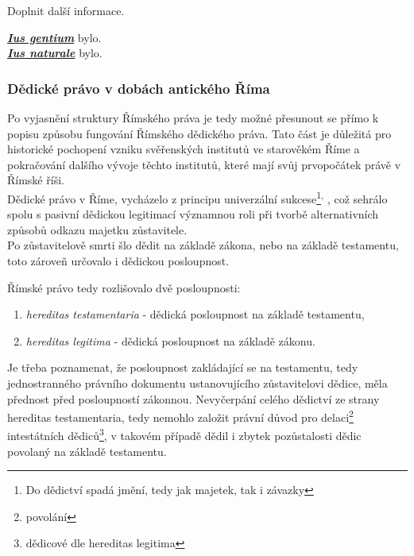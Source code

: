 \documentclass{article}
\begin{document}
Doplnit další informace. \\

\newpage

\underline{\textbf{\textit{Ius gentium}}} bylo. \\

\underline{\textbf{\textit{Ius naturale}}} bylo. \\

\newpage

\subsubsection{Dědické právo v dobách antického Říma}

Po vyjasnění struktury Římského práva je tedy možné přesunout se přímo k popisu způsobu fungování Římského dědického práva. Tato část je důležitá pro historické pochopení vzniku svěřenských institutů ve starověkém Říme a pokračování dalšího vývoje těchto institutů, které mají svůj prvopočátek právě v Římské říši. \\

Dědické právo v Říme, vycházelo z principu univerzální sukcese\footnote{Do dědictví spadá jmění, tedy jak majetek, tak i závazky}\textsuperscript{,} , což sehrálo spolu s pasivní dědickou legitimací významnou roli při tvorbě alternativních způsobů odkazu majetku zůstavitele. \\

Po zůstavitelově smrti šlo dědit na základě zákona, nebo na základě testamentu, toto zároveň určovalo i dědickou posloupnost. \\

\vspace{5 mm}

Římské právo tedy rozlišovalo dvě posloupnosti:
\begin{enumerate}
\item \textit{hereditas testamentaria} - dědická posloupnost na základě testamentu,
\item \textit{hereditas legitima} - dědická posloupnost na základě zákonu.
\end{enumerate}

\vspace{5 mm}

Je třeba poznamenat, že posloupnost zakládající se na testamentu, tedy jednostranného právního dokumentu ustanovujícího zůstavitelovi dědice, měla přednost před posloupností zákonnou. Nevyčerpání celého dědictví ze strany hereditas testamentaria, tedy nemohlo založit právní důvod pro delaci\footnote{povolání} intestátních dědiců\footnote{dědicové dle hereditas legitima}, v takovém případě dědil i zbytek pozůstalosti dědic povolaný na základě testamentu. \\
\end{document}
